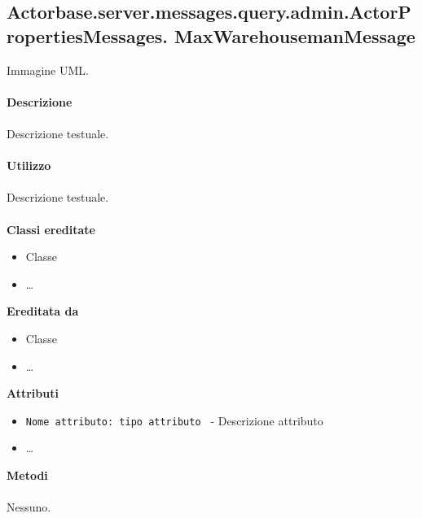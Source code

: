 \documentclass[a4paper]{article}
\begin{document}
\subsection{Actorbase.server.messages.query.admin.ActorPropertiesMessages.
\newline MaxWarehousemanMessage}
		Immagine UML.
		\\ \\
		\textbf{Descrizione}
			\\ \\
			Descrizione testuale.
			\\ \\
		\textbf{Utilizzo}
			\\ \\
			Descrizione testuale.
			\\ \\
		\textbf{Classi ereditate}
			\begin{itemize}
				\item Classe
				\item \dots
			\end{itemize}
		\textbf{Ereditata da}
			\begin{itemize}
				\item Classe
				\item \dots
			\end{itemize}
		\textbf{Attributi}
			\begin{itemize}
				\item \texttt{Nome attributo: tipo attributo } - Descrizione attributo
				\item \dots
			\end{itemize}
		\textbf{Metodi}
			\\ \\
			Nessuno.
			
\end{document}
